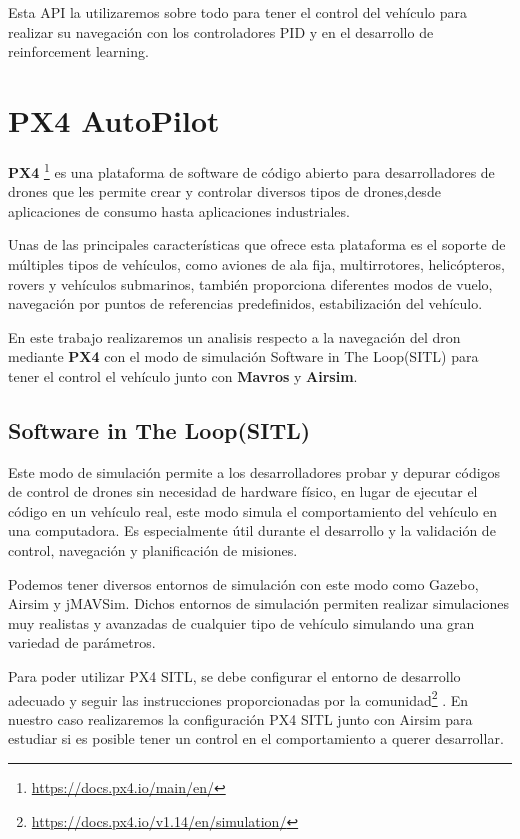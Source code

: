 Esta API la utilizaremos sobre todo para tener el control del vehículo para realizar su navegación con los controladores PID y en 
el desarrollo de reinforcement learning. 

\section{PX4 AutoPilot}
\label{sec:px4}

\textbf{PX4} \footnote{\url{https://docs.px4.io/main/en/}} es una plataforma de software de código abierto para desarrolladores de drones que les permite crear 
y controlar diversos tipos de drones,desde aplicaciones de consumo hasta aplicaciones industriales. \newline

Unas de las principales características que ofrece esta plataforma es el soporte de múltiples tipos de vehículos, como aviones de 
ala fija, multirrotores, helicópteros, rovers y vehículos submarinos, también proporciona diferentes modos de vuelo, 
navegación por puntos de referencias predefinidos, estabilización del vehículo. \newline

En este trabajo realizaremos un analisis respecto a la navegación del dron mediante \textbf{PX4} con el modo de simulación Software in The Loop(SITL) para tener el control el vehículo junto con 
\textbf{Mavros} y \textbf{Airsim}.\newline
\subsection{Software in The Loop(SITL)}
\label{sec:px4 sitl} 
Este modo de simulación permite a los desarrolladores probar y depurar códigos de control de drones sin necesidad de hardware físico, en lugar de ejecutar el código en un 
vehículo real, este modo simula el comportamiento del vehículo en una computadora. Es especialmente útil durante el desarrollo y la validación de control, navegación y 
planificación de misiones. \newline

Podemos tener diversos entornos de simulación con este modo como Gazebo, Airsim y jMAVSim. Dichos entornos de simulación permiten realizar simulaciones muy realistas y avanzadas 
de cualquier tipo de vehículo simulando una gran variedad de parámetros.\newline

Para poder utilizar PX4 SITL, se debe configurar el entorno de desarrollo adecuado y seguir las instrucciones proporcionadas por la comunidad\footnote{\url{https://docs.px4.io/v1.14/en/simulation/}} .
En nuestro caso realizaremos la configuración PX4 SITL junto con Airsim para estudiar si es posible tener un control en el comportamiento a querer
desarrollar. 


